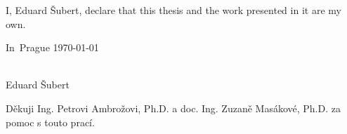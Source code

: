\documentclass[a4paper,10pt,twoside]{article}
\theoremstyle{definition}
\theoremstyle{remark}
\begin{document}




\thispagestyle{empty}
\cleardoublepage

\thispagestyle{empty}



\vspace{0.5cm}

I, Eduard Šubert, declare that this thesis and the work presented in it are my own.

\vspace{1.5cm}

\noindent
\begin{minipage}[b]{5cm}
In~Prague \today
\end{minipage}
\hfill
\begin{minipage}[t]{5cm}
\begin{center}
\dotfill\\
Eduard Šubert
\end{center}
\end{minipage}

\vspace*{2cm}


\cleardoublepage

\thispagestyle{empty}

\begin{center}\small
Děkuji Ing. Petrovi Ambrožovi, Ph.D. a doc. Ing. Zuzaně Masákové, Ph.D. za pomoc s touto prací.
\end{center}
\end{document}
